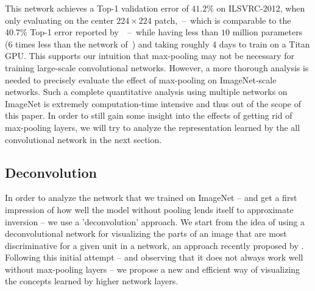 \documentclass{article} \usepackage{iclr2015,times}
\begin{document}
This network achieves a Top-1 validation error of $41.2 \%$ on ILSVRC-2012, when only evaluating on the center $224\times224$ patch,~--~which is comparable to the $40.7 \%$ Top-1 error reported by~\citet{Krizhevsky_NIPS2012}~--~while having less than $10$ million parameters (6 times less than the network of~\citet{Krizhevsky_NIPS2012}) and taking roughly $4$ days to train on a Titan GPU. This supports our intuition that max-pooling may not be necessary for training large-scale convolutional networks. However, a more thorough analysis is needed to precisely evaluate the effect of max-pooling on ImageNet-scale networks. Such a complete quantitative analysis using multiple networks on ImageNet is extremely computation-time intensive and thus out of the scope of this paper. In order to still gain some insight into the effects of getting rid of max-pooling layers, we will try to analyze the representation learned by the all convolutional network in the next section.

\subsection{Deconvolution}
In order to analyze the network that we trained on ImageNet -- and get a first impression of how well the model without pooling lends itself to approximate inversion -- we use a 'deconvolution' approach. We start from the idea of using a deconvolutional network for visualizing the parts of an image that are most discriminative for a given unit in a network, an approach recently proposed by \citet{Zeiler_ECCV2014}. Following this initial attempt -- and observing that it does not always work well without max-pooling layers -- we propose a new and efficient way of visualizing the concepts learned by higher network layers. 
\end{document}
